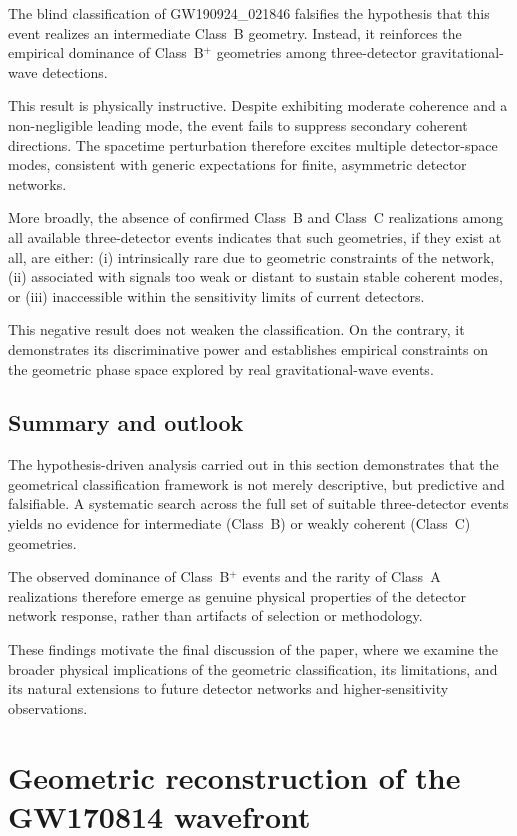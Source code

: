 \documentclass[11pt,a4paper]{article}
\begin{document}
The blind classification of GW190924\_021846 falsifies the hypothesis that this event
realizes an intermediate Class~B geometry.
Instead, it reinforces the empirical dominance of Class~B$^+$ geometries among
three-detector gravitational-wave detections.

This result is physically instructive.
Despite exhibiting moderate coherence and a non-negligible leading mode, the event fails
to suppress secondary coherent directions.
The spacetime perturbation therefore excites multiple detector-space modes, consistent
with generic expectations for finite, asymmetric detector networks.

More broadly, the absence of confirmed Class~B and Class~C realizations among all
available three-detector events indicates that such geometries, if they exist at all,
are either:
(i) intrinsically rare due to geometric constraints of the network,
(ii) associated with signals too weak or distant to sustain stable coherent modes, or
(iii) inaccessible within the sensitivity limits of current detectors.

This negative result does not weaken the classification.
On the contrary, it demonstrates its discriminative power and establishes empirical
constraints on the geometric phase space explored by real gravitational-wave events.

\subsection{Summary and outlook}

The hypothesis-driven analysis carried out in this section demonstrates that the
geometrical classification framework is not merely descriptive, but predictive and
falsifiable.
A systematic search across the full set of suitable three-detector events yields no
evidence for intermediate (Class~B) or weakly coherent (Class~C) geometries.

The observed dominance of Class~B$^+$ events and the rarity of Class~A realizations
therefore emerge as genuine physical properties of the detector network response, rather
than artifacts of selection or methodology.

These findings motivate the final discussion of the paper, where we examine the broader
physical implications of the geometric classification, its limitations, and its natural
extensions to future detector networks and higher-sensitivity observations.

\section{Geometric reconstruction of the GW170814 wavefront}
\end{document}
